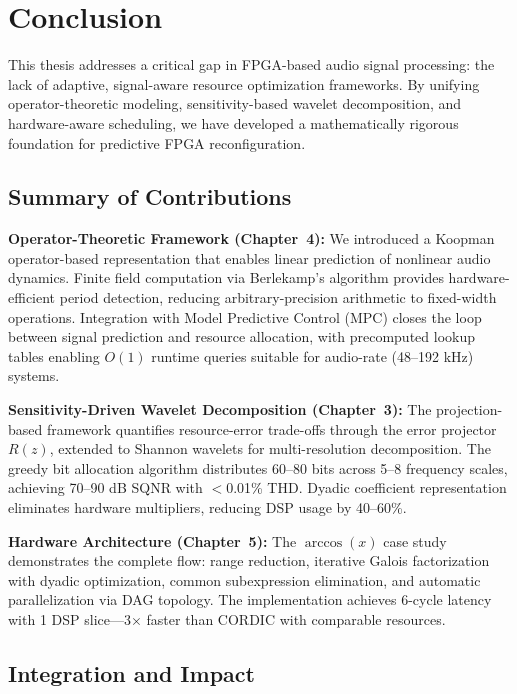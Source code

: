 \chapter{Conclusion}

This thesis addresses a critical gap in FPGA-based audio signal processing: the lack of adaptive, signal-aware resource optimization frameworks. By unifying operator-theoretic modeling, sensitivity-based wavelet decomposition, and hardware-aware scheduling, we have developed a mathematically rigorous foundation for predictive FPGA reconfiguration.

\section{Summary of Contributions}

\textbf{Operator-Theoretic Framework (Chapter~4):} We introduced a Koopman operator-based representation that enables linear prediction of nonlinear audio dynamics. Finite field computation via Berlekamp's algorithm provides hardware-efficient period detection, reducing arbitrary-precision arithmetic to fixed-width operations. Integration with Model Predictive Control (MPC) closes the loop between signal prediction and resource allocation, with precomputed lookup tables enabling $O(1)$ runtime queries suitable for audio-rate (48--192 kHz) systems.

\textbf{Sensitivity-Driven Wavelet Decomposition (Chapter~3):} The projection-based framework quantifies resource-error trade-offs through the error projector $R(z)$, extended to Shannon wavelets for multi-resolution decomposition. The greedy bit allocation algorithm distributes 60--80 bits across 5--8 frequency scales, achieving 70--90 dB SQNR with $<$0.01\% THD. Dyadic coefficient representation eliminates hardware multipliers, reducing DSP usage by 40--60\%.

\textbf{Hardware Architecture (Chapter~5):} The $\arccos(x)$ case study demonstrates the complete flow: range reduction, iterative Galois factorization with dyadic optimization, common subexpression elimination, and automatic parallelization via DAG topology. The implementation achieves 6-cycle latency with 1 DSP slice—3$\times$ faster than CORDIC with comparable resources.

\section{Integration and Impact}

